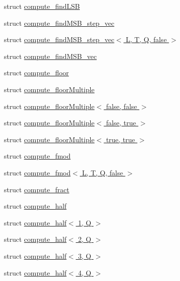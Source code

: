 \begin{DoxyCompactItemize}
\item 
struct \hyperlink{structglm_1_1detail_1_1compute__find_l_s_b}{compute\+\_\+find\+L\+SB}
\item 
struct \hyperlink{structglm_1_1detail_1_1compute__find_m_s_b__step__vec}{compute\+\_\+find\+M\+S\+B\+\_\+step\+\_\+vec}
\item 
struct \hyperlink{structglm_1_1detail_1_1compute__find_m_s_b__step__vec_3_01_l_00_01_t_00_01_q_00_01false_01_4}{compute\+\_\+find\+M\+S\+B\+\_\+step\+\_\+vec$<$ L, T, Q, false $>$}
\item 
struct \hyperlink{structglm_1_1detail_1_1compute__find_m_s_b__vec}{compute\+\_\+find\+M\+S\+B\+\_\+vec}
\item 
struct \hyperlink{structglm_1_1detail_1_1compute__floor}{compute\+\_\+floor}
\item 
struct \hyperlink{structglm_1_1detail_1_1compute__floor_multiple}{compute\+\_\+floor\+Multiple}
\item 
struct \hyperlink{structglm_1_1detail_1_1compute__floor_multiple_3_01false_00_01false_01_4}{compute\+\_\+floor\+Multiple$<$ false, false $>$}
\item 
struct \hyperlink{structglm_1_1detail_1_1compute__floor_multiple_3_01false_00_01true_01_4}{compute\+\_\+floor\+Multiple$<$ false, true $>$}
\item 
struct \hyperlink{structglm_1_1detail_1_1compute__floor_multiple_3_01true_00_01true_01_4}{compute\+\_\+floor\+Multiple$<$ true, true $>$}
\item 
struct \hyperlink{structglm_1_1detail_1_1compute__fmod}{compute\+\_\+fmod}
\item 
struct \hyperlink{structglm_1_1detail_1_1compute__fmod_3_01_l_00_01_t_00_01_q_00_01false_01_4}{compute\+\_\+fmod$<$ L, T, Q, false $>$}
\item 
struct \hyperlink{structglm_1_1detail_1_1compute__fract}{compute\+\_\+fract}
\item 
struct \hyperlink{structglm_1_1detail_1_1compute__half}{compute\+\_\+half}
\item 
struct \hyperlink{structglm_1_1detail_1_1compute__half_3_011_00_01_q_01_4}{compute\+\_\+half$<$ 1, Q $>$}
\item 
struct \hyperlink{structglm_1_1detail_1_1compute__half_3_012_00_01_q_01_4}{compute\+\_\+half$<$ 2, Q $>$}
\item 
struct \hyperlink{structglm_1_1detail_1_1compute__half_3_013_00_01_q_01_4}{compute\+\_\+half$<$ 3, Q $>$}
\item 
struct \hyperlink{structglm_1_1detail_1_1compute__half_3_014_00_01_q_01_4}{compute\+\_\+half$<$ 4, Q $>$}

\end{DoxyCompactItemize}
